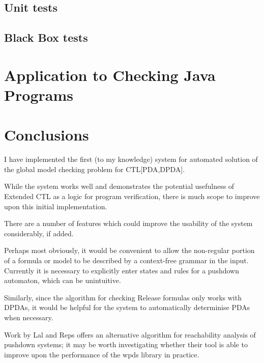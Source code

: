 \documentclass[11pt]{article}
\theoremstyle{definition}
\begin{document}
\subsection{Unit tests}


\subsection{Black Box tests}




\section{Application to Checking Java Programs}

\cite{hague2010analysing}

\section{Conclusions}

I have implemented the first (to my knowledge) system for automated solution of
the global model checking problem for CTL[PDA,DPDA].




While the system works well and demonstrates the potential usefulness of
Extended CTL as a logic for program verification, there is much scope to
improve upon this initial implementation. 

There are a number of features which could improve the usability of the system
considerably, if added.

Perhaps most obviously, it would be convenient to allow the non-regular portion
of a formula or model to be described by a context-free grammar in the input.
Currently it is necessary to explicitly enter states and rules for a pushdown
automaton, which can be unintuitive. 

Similarly, since the algorithm for checking Release formulas only works with
DPDAs, it would be helpful for the system to automatically determinise PDAs
when necessary.



Work by Lal and Reps\cite{lal2006improving} offers an alternative algorithm for
reachability analysis of pushdown systems; it may be worth investigating
whether their tool is able to improve upon the performance of the wpds library
in practice.
\end{document}
